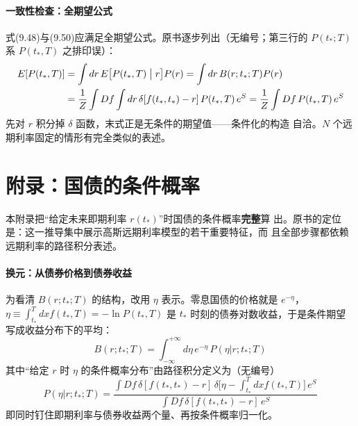 \paragraph{一致性检查：全期望公式}
式(9.48)与(9.50)应满足全期望公式。原书逐步列出（无编号；第三行的
$P(t_*;T)$ 系 $P(t_*,T)$ 之排印误）：
\begin{align*}
E[P(t_*,T)]&=\int dr\,E\bigl[P(t_*,T)\bigm|r\bigr]P(r)
=\int dr\,B(r;t_*;T)P(r)\\
&=\frac{1}{Z}\int Df\int dr\,\delta[f(t_*,t_*)-r]\,P(t_*,T)\,e^{S}
=\frac{1}{Z}\int Df\,P(t_*,T)\,e^{S}
\end{align*}
先对 $r$ 积分掉 $\delta$ 函数，末式正是无条件的期望值——条件化的构造
自洽。$N$ 个远期利率固定的情形有完全类似的表述。

\section{附录：国债的条件概率}

本附录把“给定未来即期利率 $r(t_*)$”时国债的条件概率\textbf{完整}算
出。原书的定位是：这一推导集中展示高斯远期利率模型的若干重要特征，而
且全部步骤都依赖远期利率的路径积分表述。

\paragraph{换元：从债券价格到债券收益}
为看清 $B(r;t_*;T)$ 的结构，改用 $\eta$ 表示。零息国债的价格就是
$e^{-\eta}$，$\eta\equiv\int_{t_*}^{T}dxf(t_*,T)=-\ln P(t_*,T)$ 是
$t_*$ 时刻的债券对数收益，于是条件期望写成收益分布下的平均：
\begin{equation*}
B(r;t_*;T)=\int_{-\infty}^{+\infty}d\eta\,e^{-\eta}\,P(\eta|r;t_*;T)
\tag{9.51}
\end{equation*}
其中“给定 $r$ 时 $\eta$ 的条件概率分布”由路径积分定义为（无编号）
\begin{equation*}
P(\eta|r;t_*;T)=
\frac{\int Df\,\delta[f(t_*,t_*)-r]\,
\delta\bigl[\eta-\int_{t_*}^{T}dxf(t_*,T)\bigr]\,e^{S}}
{\int Df\,\delta[f(t_*,t_*)-r]\,e^{S}}
\end{equation*}
即同时钉住即期利率与债券收益两个量、再按条件概率归一化。

